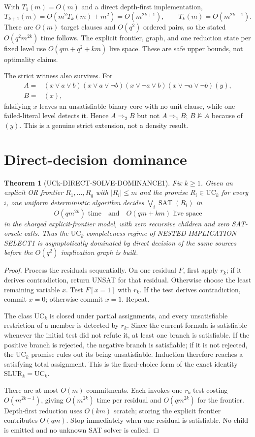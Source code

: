 \documentclass[11pt]{article}
\newtheorem{theorem}{Theorem}
\newcommand{\SAT}{\operatorname{SAT}}
\begin{document}
With $T_1(m)=O(m)$ and a direct depth-first implementation,
\[
 T_{k+1}(m)=O(m^2T_k(m)+m^2)=O(m^{2k+1}),
 \qquad T_k(m)=O(m^{2k-1}).
\]
There are $O(m)$ target clauses and $O(q^2)$ ordered pairs, so the stated
$O(q^2m^{2k})$ time follows.  The explicit frontier, graph, and one reduction
state per fixed level use $O(qm+q^2+km)$ live space.  These are safe upper
bounds, not optimality claims.

The strict witness also survives.  For
\begin{align*}
A={}&(x\vee a\vee b)(x\vee a\vee\neg b)
(x\vee\neg a\vee b)(x\vee\neg a\vee\neg b)(y),\\
B={}&(x),
\end{align*}
falsifying $x$ leaves an unsatisfiable binary core with no unit clause, while
one failed-literal level detects it.  Hence $A\Rightarrow_2B$ but not
$A\Rightarrow_1B$; $B\not\models A$ because of $(y)$.  This is a genuine
strict extension, not a density result.

\section{Direct-decision dominance}
\begin{theorem}[UCk-DIRECT-SOLVE-DOMINANCE1]
Fix $k\geq1$.  Given an explicit OR frontier $R_1,\ldots,R_q$ with
$|R_i|\leq m$ and the promise $R_i\in\mathrm{UC}_k$ for every $i$, one
uniform deterministic algorithm decides
$\bigvee_i\SAT(R_i)$ in
\[
 O(qm^{2k})\text{ time}
 \quad\text{and}\quad
 O(qm+km)\text{ live space}
\]
in the charged explicit-frontier model, with zero recursive children and
zero SAT-oracle calls.  Thus the $\mathrm{UC}_k$-completeness regime of
NESTED-IMPLICATION-SELECT1 is asymptotically dominated by direct decision of
the same sources before the $O(q^2)$ implication graph is built.
\end{theorem}
\begin{proof}
Process the residuals sequentially.  On one residual $F$, first apply $r_k$;
if it derives contradiction, return UNSAT for that residual.  Otherwise
choose the least remaining variable $x$.  Test $F[x=1]$ with $r_k$.  If the
test derives contradiction, commit $x=0$; otherwise commit $x=1$.  Repeat.

The class $\mathrm{UC}_k$ is closed under partial assignments, and every
unsatisfiable restriction of a member is detected by $r_k$.  Since the
current formula is satisfiable whenever the initial test did not refute it,
at least one branch is satisfiable.  If the positive branch is rejected, the
negative branch is satisfiable; if it is not rejected, the $\mathrm{UC}_k$
promise rules out its being unsatisfiable.  Induction therefore reaches a
satisfying total assignment.  This is the fixed-choice form of the exact
identity $\mathrm{SLUR}_k=\mathrm{UC}_k$.

There are at most $O(m)$ commitments.  Each invokes one $r_k$ test costing
$O(m^{2k-1})$, giving $O(m^{2k})$ time per residual and $O(qm^{2k})$ for the
frontier.  Depth-first reduction uses $O(km)$ scratch; storing the explicit
frontier contributes $O(qm)$.  Stop immediately when one residual is
satisfiable.  No child is emitted and no unknown SAT solver is called.
\end{proof}
\end{document}
